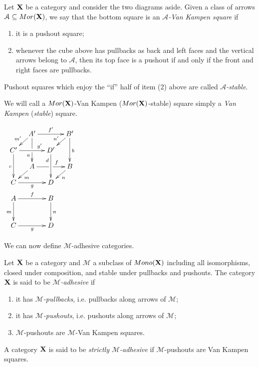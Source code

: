 \documentclass[a4paper,UKenglish,cleveref,pdftex,thm-restate,numberwithinsect,anonymous]{lipics}
\newcommand{\mor}{\mathsf{Mor}}
\newcommand{\mon}{\mathsf{Mono}}
\def\A{\textbf {\textup{A}}}
\def\C{\textbf {\textup{C}}}
\def\X{\textbf {\textup{X}}}
\begin{document}
\noindent
\parbox{10cm}{
  \begin{definition}
    Let $\X$ be a category and consider the two diagrams aside.
    Given  a class of arrows $\mathcal{A}\subseteq \mor(\X)$, we say that the bottom square
    is an \emph{$\mathcal{A}$-Van Kampen square} if
    \begin{enumerate}
    \item it is a pushout square;
    \item 	whenever the cube above has pullbacks as back and left faces and the vertical arrows belong to $\mathcal{A}$, then its top face is a pushout 
    if and only if the front and right faces are pullbacks.
    \end{enumerate}
    Pushout squares which enjoy the ``if'' half of item (2) above are called \emph{$\mathcal{A}$-stable}.
    
    We will call a $\mor(\X)$-Van Kampen ($\mor(\X)$-stable) square simply a \emph{Van Kampen} (\emph{stable}) square.
  \end{definition}}
\parbox{2cm}{$\xymatrix@C=10pt@R=10pt{&A'\ar[dd]|\hole_(.65){a}\ar[rr]^{f'} \ar[dl]_{m'} && B' \ar[dd]^{b} \ar[dl]_{n'} \\ C'  \ar[dd]_{c}\ar[rr]^(.7){g'} & & D' \ar[dd]_(.3){d}\\&A\ar[rr]|\hole^(.65){f} \ar[dl]^{m} && B \ar[dl]^{n} \\C \ar[rr]_{g} & & D \\A \ar[dd]_{m}\ar[rr]^{f}&&B\ar[dd]^{n}\\ \\C\ar[rr]_{g} &&D}$ }


We can now define $\mathcal{M}$-adhesive categories.

\begin{definition}
  Let $\X$ be a category and $\mathcal{M}$ a subclass of
  $\mon(\X)$
  including  all isomorphisms, closed under composition,
  and stable under pullbacks and pushouts.
  The category
  $\X$ is said to be \emph{$\mathcal{M}$-adhesive} if
  \begin{enumerate}
  \item it has \emph{$\mathcal{M}$-pullbacks}, i.e. pullbacks along arrows of $\mathcal{M}$;
  \item it has \emph{$\mathcal{M}$-pushouts}, i.e. pushouts along arrows of $\mathcal{M}$;
  \item  $\mathcal{M}$-pushouts are $\mathcal{M}$-Van Kampen squares.
  \end{enumerate}
  
  A category $\X$ is said to be \emph{strictly $\mathcal{M}$-adhesive}
  if $\mathcal{M}$-pushouts are Van Kampen squares.
\end{definition}
\end{document}
